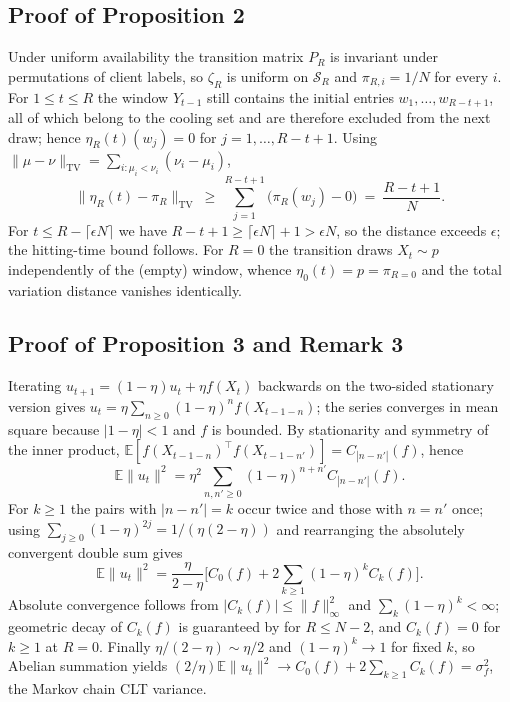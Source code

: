 \documentclass[twoside,11pt]{article}
\begin{document}
\subsection{Proof of Proposition 2}
Under uniform availability the transition matrix $P_R$ is invariant under permutations of client labels, so $\zeta_R$ is uniform on $\mathcal{S}_R$ and $\pi_{R,i}=1/N$ for every $i$. For $1\leq t\leq R$ the window $Y_{t-1}$ still contains the initial entries $w_1,\dots,w_{R-t+1}$, all of which belong to the cooling set and are therefore excluded from the next draw; hence $\eta_R(t)(w_j)=0$ for $j=1,\dots,R-t+1$. Using $\|\mu-\nu\|_{\mathrm{TV}}=\sum_{i:\mu_i<\nu_i}(\nu_i-\mu_i)$,
\begin{equation}\label{eq:e39}
\|\eta_R(t)-\pi_R\|_{\mathrm{TV}}\ \geq\ \sum_{j=1}^{R-t+1}\big(\pi_R(w_j)-0\big)\ =\ \dfrac{R-t+1}{N}.
\end{equation}
For $t\leq R-\lceil\epsilon N\rceil$ we have $R-t+1\geq\lceil\epsilon N\rceil+1>\epsilon N$, so the distance exceeds $\epsilon$; the hitting-time bound follows. For $R=0$ the transition draws $X_t\sim p$ independently of the (empty) window, whence $\eta_0(t)=p=\pi_{R=0}$ and the total variation distance vanishes identically.

\subsection{Proof of Proposition 3 and Remark 3}
Iterating $u_{t+1}=(1-\eta)u_t+\eta f(X_t)$ backwards on the two-sided stationary version gives $u_t=\eta\sum_{n\geq0}\left(1-\eta\right)^{n}f(X_{t-1-n})$; the series converges in mean square because $|1-\eta|<1$ and $f$ is bounded. By stationarity and symmetry of the inner product, $\mathbb{E}[f(X_{t-1-n})^{\top}f(X_{t-1-n'})]=C_{|n-n'|}(f)$, hence
\begin{equation}\label{eq:e40}
\mathbb{E}\|u_t\|^{2}=\eta^{2}\sum_{n,n'\geq0}\left(1-\eta\right)^{n+n'}C_{|n-n'|}(f).
\end{equation}
For $k\geq1$ the pairs with $|n-n'|=k$ occur twice and those with $n=n'$ once; using $\sum_{j\geq0}\left(1-\eta\right)^{2j}=1/(\eta(2-\eta))$ and rearranging the absolutely convergent double sum gives
\begin{equation}\label{eq:e41}
\mathbb{E}\|u_t\|^{2} =\dfrac{\eta}{2-\eta}\Big[C_0(f)+2\sum_{k\geq1}(1-\eta)^{k}C_k(f)\Big].
\end{equation}
Absolute convergence follows from $|C_k(f)|\leq\|f\|_\infty^{2}$ and $\sum_k\left(1-\eta\right)^{k}<\infty$; geometric decay of $C_k(f)$ is guaranteed by \citep[Theorem~4.9]{ref24} for $R\leq N-2$, and $C_k(f)=0$ for $k\geq1$ at $R=0$. Finally $\eta/(2-\eta)\sim\eta/2$ and $\left(1-\eta\right)^{k}\to1$ for fixed $k$, so Abelian summation yields $(2/\eta)\mathbb{E}\|u_t\|^{2}\to C_0(f)+2\sum_{k\geq1}C_k(f)=\sigma_f^{2}$, the Markov chain CLT variance.
\end{document}
